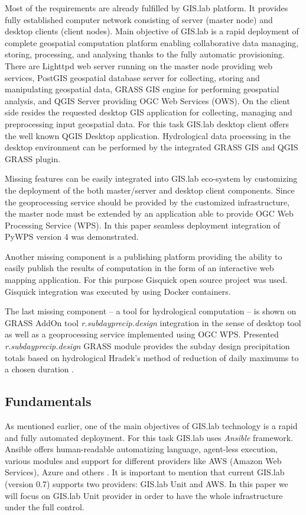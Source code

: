 \documentclass{isprs}
\begin{document}
Most of the requirements are already fulfilled by GIS.lab platform. It
provides fully established computer network consisting of server
(master node) and desktop clients (client nodes). Main objective of
GIS.lab is a rapid deployment of complete geospatial computation
platform enabling collaborative data managing, storing, processing,
and analysing thanks to the fully automatic provisioning. There are
Lighttpd web server running on the master node providing web services,
PostGIS geospatial database server for collecting, storing and
manipulating geospatial data, GRASS GIS engine for performing
geospatial analysis, and QGIS Server providing OGC Web Services
(OWS). On the client side resides the requested desktop GIS
application for collecting, managing and preprocessing input
geospatial data. For this task GIS.lab desktop client offers the well
known QGIS Desktop application. Hydrological data processing in the
desktop environment can be performed by the integrated GRASS GIS and
QGIS GRASS plugin.

Missing features can be easily integrated into GIS.lab eco-system by
customizing the deployment of the both master/server and desktop
client components. Since the geoprocessing service should be provided
by the customized infrastructure, the master node must be extended by
an application able to provide OGC Web Processing Service (WPS). In
this paper seamless deployment integration of PyWPS version 4 was 
demonstrated.

Another missing component is a publishing platform providing the
ability to easily publish the results of computation in the form of an
interactive web mapping application. For this purpose Gisquick open
source project was used. Gisquick integration was executed by using
Docker containers.

The last missing component -- a tool for hydrological computation --
is shown on GRASS AddOn tool \textit{r.subdayprecip.design}
integration in the sense of desktop tool as well as a geoprocessing
service implemented using OGC WPS. Presented
\textit{r.subdayprecip.design} GRASS module provides the subday design
precipitation totals based on hydrological Hradek's method of
reduction of daily maximums to a chosen duration
\cite{landa.2015:FOSS4GE2015}.

\subsection{Fundamentals}

As mentioned earlier, one of the main objectives of GIS.lab technology
is a rapid and fully automated deployment. For this task GIS.lab uses
\textit{Ansible} framework. Ansible offers human-readable automatizing
language, agent-less execution, various modules and support for
different providers like AWS (Amazon Web Services), Azure and others
\cite{hochstein2014ansible}. It is important to mention that current
GIS.lab (version 0.7) supports two providers: GIS.lab Unit and AWS. In
this paper we will focus on GIS.lab Unit provider in order to have the
whole infrastructure under the full control.
\end{document}
